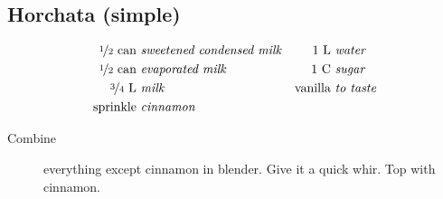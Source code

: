 \subsection{Horchata (simple)}

\begin{align*}
    \text{\nicefrac{1}{2}~can} &~\text{\emph{sweetened condensed milk}} & \text{1~L} &~\text{\emph{water}}        \\
    \text{\nicefrac{1}{2}~can} &~\text{\emph{evaporated milk}}          & \text{1~C} &~\text{\emph{sugar}}        \\
    \text{\nicefrac{3}{4}~L} &~\text{\emph{milk}}                       & \text{vanilla} &~\text{\emph{to taste}} \\
    \text{sprinkle} &~\text{\emph{cinnamon}}
\end{align*}

\begin{description}
    \item[Combine]everything except cinnamon in blender. Give it a quick whir. Top with cinnamon.
\end{description}

\pagebreak
